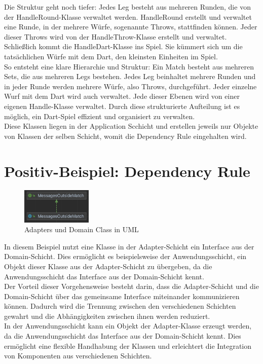 Die Struktur geht noch tiefer: Jedes Leg besteht aus mehreren Runden, die von der HandleRound-Klasse verwaltet werden. HandleRound erstellt und verwaltet eine Runde, in der mehrere Würfe, sogenannte Throws, stattfinden können. Jeder dieser Throws wird von der HandleThrow-Klasse erstellt und verwaltet.\\

Schließlich kommt die HandleDart-Klasse ins Spiel. Sie kümmert sich um die tatsächlichen Würfe mit dem Dart, den kleinsten Einheiten im Spiel.\\

So entsteht eine klare Hierarchie und Struktur: Ein Match besteht aus mehreren Sets, die aus mehreren Legs bestehen. Jedes Leg beinhaltet mehrere Runden und in jeder Runde werden mehrere Würfe, also Throws, durchgeführt. Jeder einzelne Wurf mit dem Dart wird auch verwaltet. Jede dieser Ebenen wird von einer eigenen Handle-Klasse verwaltet. Durch diese strukturierte Aufteilung ist es möglich, ein Dart-Spiel effizient und organisiert zu verwalten.\\
Diese Klassen liegen in der Application Scchicht und erstellen jeweils nur Objekte von Klassen der selben Schicht, womit die Dependency Rule eingehalten wird.
\section{Positiv-Beispiel: Dependency Rule}
\begin{figure}[ht]
    \includegraphics[width=0.3\textwidth]{Bilder/adapters_domain_uml.png}
    \caption{Adapters und Domain Class in UML}
    \label{fig:adapters-domain-uml}
\end{figure}
In diesem Beispiel nutzt eine Klasse in der Adapter-Schicht ein Interface aus der Domain-Schicht. Dies ermöglicht es beispielsweise der Anwendungsschicht, ein Objekt dieser Klasse aus der Adapter-Schicht zu übergeben, da die Anwendungsschicht das Interface aus der Domain-Schicht kennt.
\\
Der Vorteil dieser Vorgehensweise besteht darin, dass die Adapter-Schicht und die Domain-Schicht über das gemeinsame Interface miteinander kommunizieren können. Dadurch wird die Trennung zwischen den verschiedenen Schichten gewahrt und die Abhängigkeiten zwischen ihnen werden reduziert.
\\
In der Anwendungsschicht kann ein Objekt der Adapter-Klasse erzeugt werden, da die Anwendungsschicht das Interface aus der Domain-Schicht kennt. Dies ermöglicht eine flexible Handhabung der Klassen und erleichtert die Integration von Komponenten aus verschiedenen Schichten.
